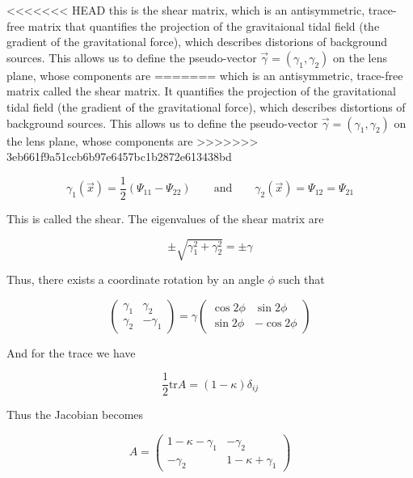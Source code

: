 <<<<<<< HEAD
this is the shear matrix, which is an antisymmetric, trace-free matrix that quantifies the projection of the gravitaional tidal field (the gradient of the gravitational force), which describes distorions of background sources.  This allows us to define the pseudo-vector $\vec{\gamma}=(\gamma_1 , \gamma_2)$ on the lens plane, whose components are
=======
which is an antisymmetric, trace-free matrix called the shear matrix. It quantifies the projection of the gravitational tidal field (the gradient of the gravitational force), which describes distortions of background sources.  This allows us to define the pseudo-vector $\vec{\gamma}=(\gamma_1 , \gamma_2)$ on the lens plane, whose components are
>>>>>>> 3eb661f9a51ccb6b97e6457bc1b2872e613438bd

\begin{equation}
\gamma_1(\vec{x})=\frac{1}{2}(\Psi_{11}-\Psi_{22})\qquad \text{and} \qquad \gamma_2(\vec{x})=\Psi_{12} = \Psi_{21}
\end{equation}

This is called the shear. The eigenvalues of the shear matrix are 

\begin{equation}
\pm \sqrt{\gamma_1^2 + \gamma_2^2} = \pm \gamma
\end{equation}

Thus, there exists a coordinate rotation by an angle $\phi$ such that 

\begin{equation}
\left(\begin{array}{cc}
\gamma_{1} & \gamma_{2}\\
\gamma_{2} & -\gamma_{1}
\end{array}\right)=\gamma\left(\begin{array}{cc}
\cos2\phi & \sin2\phi\\
\sin2\phi & -\cos2\phi
\end{array}\right)
\end{equation}

And for the trace we have

\begin{equation}
\frac{1}{2}\text{tr}A=(1-\kappa)\delta_{ij}
\end{equation}

Thus the Jacobian becomes 

\begin{equation}
A= \left(\begin{array}{cc}
1-\kappa-\gamma_{1} & -\gamma_{2}\\
-\gamma_{2} & 1-\kappa+\gamma_{1}
\end{array}\right)
\end{equation}

